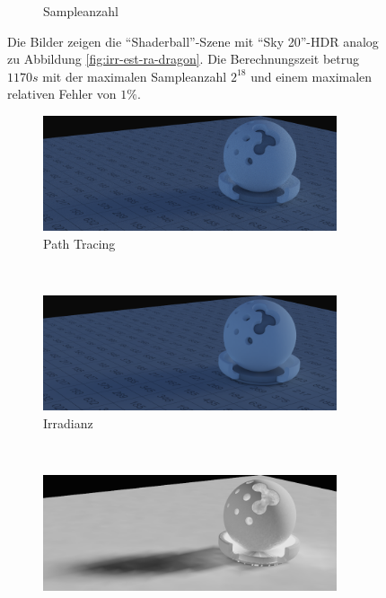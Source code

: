 \begin{figure}[h]
\begin{subfigure}[t]{0.33\textwidth}
			\caption{Sampleanzahl}
		\end{subfigure}
		\caption[Vertex Lighting anhand der \enquote{Shaderball}-Szene mit \enquote{Sky 20}-HDR]{Die Bilder zeigen die \enquote{Shaderball}-Szene mit \enquote{Sky 20}-HDR analog zu Abbildung \ref{fig:irr-est-ra-dragon}. Die Berechnungszeit betrug $1170\unit{s}$ mit der maximalen Sampleanzahl $2^{18}$ und einem maximalen relativen Fehler von $1\unit{\%}$.}
		\label{fig:irr-est-ra-shaderball}
	\end{figure}

	\begin{figure}[h]
		\begin{subfigure}[t]{\textwidth}
			\center
			\includegraphics[width=0.95\textwidth]{pic/irr_est-ra-shaderball3-ref.png}
			\caption{Path Tracing}
		\end{subfigure}
		\medskip \\
		\begin{subfigure}[t]{\textwidth}
			\center
			\includegraphics[width=0.95\textwidth]{pic/irr_est-ra-shaderball3-irr.png}
			\caption{Irradianz}
		\end{subfigure}
		\medskip \\
		\begin{subfigure}[t]{\textwidth}
			\center
			\includegraphics[width=0.95\textwidth]{pic/irr_est-ra-shaderball3-scount.png}

\end{subfigure}
\end{figure}
